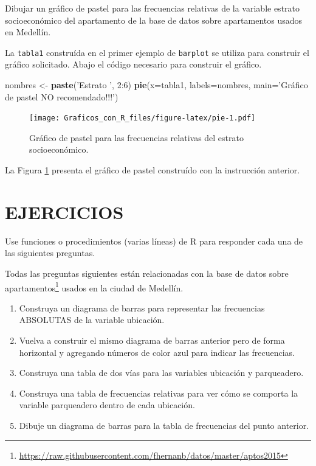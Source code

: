 \documentclass[10pt,]{krantz}
\makeatletter
\newenvironment{Shaded}{\begin{snugshade}}{\end{snugshade}}
\newcommand{\KeywordTok}[1]{\textcolor[rgb]{0.13,0.29,0.53}{\textbf{{#1}}}}
\newcommand{\DataTypeTok}[1]{\textcolor[rgb]{0.13,0.29,0.53}{{#1}}}
\newcommand{\DecValTok}[1]{\textcolor[rgb]{0.00,0.00,0.81}{{#1}}}
\newcommand{\StringTok}[1]{\textcolor[rgb]{0.31,0.60,0.02}{{#1}}}
\newcommand{\NormalTok}[1]{{#1}}
\providecommand{\tightlist}{%
  \setlength{\itemsep}{0pt}\setlength{\parskip}{0pt}}
\let\proglang=\textsf
\renewcommand{\href}[2]{#2\footnote{\url{#1}}}
\newenvironment{kframe}{%
\medskip{}
\setlength{\fboxsep}{.8em}
 \def\at@end@of@kframe{}%
 \ifinner\ifhmode%
  \def\at@end@of@kframe{\end{minipage}}%
  \begin{minipage}{\columnwidth}%
 \fi\fi%
 \def\FrameCommand##1{\hskip\@totalleftmargin \hskip-\fboxsep
 \colorbox{shadecolor}{##1}\hskip-\fboxsep
     \hskip-\linewidth \hskip-\@totalleftmargin \hskip\columnwidth}%
 \MakeFramed {\advance\hsize-\width
   \@totalleftmargin\z@ \linewidth\hsize
   \@setminipage}}%
 {\par\unskip\endMakeFramed%
 \at@end@of@kframe}
\renewenvironment{Shaded}{\begin{kframe}}{\end{kframe}}
\makeatother
\begin{document}
Dibujar un gráfico de pastel para las frecuencias relativas de la
variable estrato socioeconómico del apartamento de la base de datos
sobre apartamentos usados en Medellín.

La \texttt{tabla1} construída en el primer ejemplo de \texttt{barplot}
se utiliza para construir el gráfico solicitado. Abajo el código
necesario para construir el gráfico.

\begin{Shaded}
\begin{Highlighting}[]
\NormalTok{nombres <-}\StringTok{ }\KeywordTok{paste}\NormalTok{(}\StringTok{'Estrato '}\NormalTok{, }\DecValTok{2}\NormalTok{:}\DecValTok{6}\NormalTok{)}
\KeywordTok{pie}\NormalTok{(}\DataTypeTok{x=}\NormalTok{tabla1, }\DataTypeTok{labels=}\NormalTok{nombres, }
    \DataTypeTok{main=}\StringTok{'Gráfico de pastel NO recomendado!!!'}\NormalTok{)}
\end{Highlighting}
\end{Shaded}

\begin{figure}[htbp]
\centering
\texttt{[image: Graficos\_con\_R\_files/figure-latex/pie-1.pdf]}
\caption{\label{fig:pie}Gráfico de pastel para las frecuencias relativas del
estrato socioeconómico.}
\end{figure}

La Figura \ref{fig:pie} presenta el gráfico de pastel construído con la
instrucción anterior.

\section*{EJERCICIOS}\label{ejercicios}


Use funciones o procedimientos (varias líneas) de \proglang{R} para
responder cada una de las siguientes preguntas.

Todas las preguntas siguientes están relacionadas con la base de datos
sobre
\href{https://raw.githubusercontent.com/fhernanb/datos/master/aptos2015}{apartamentos}
usados en la ciudad de Medellín.

\begin{enumerate}
\def\labelenumi{\arabic{enumi}.}
\tightlist
\item
  Construya un diagrama de barras para representar las frecuencias
  ABSOLUTAS de la variable ubicación.
\item
  Vuelva a construir el mismo diagrama de barras anterior pero de forma
  horizontal y agregando números de color azul para indicar las
  frecuencias.
\item
  Construya una tabla de dos vías para las variables ubicación y
  parqueadero.
\item
  Construya una tabla de frecuencias relativas para ver cómo se comporta
  la variable parqueadero dentro de cada ubicación.
\item
  Dibuje un diagrama de barras para la tabla de frecuencias del punto
  anterior.
\end{enumerate}
\end{document}
